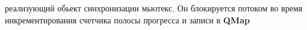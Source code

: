 реализующий обьект синхронизации мьютекс. Он блокируется потоком во
время инкрементирования счетчика полосы прогресса и записи в
\textbf{QMap}
